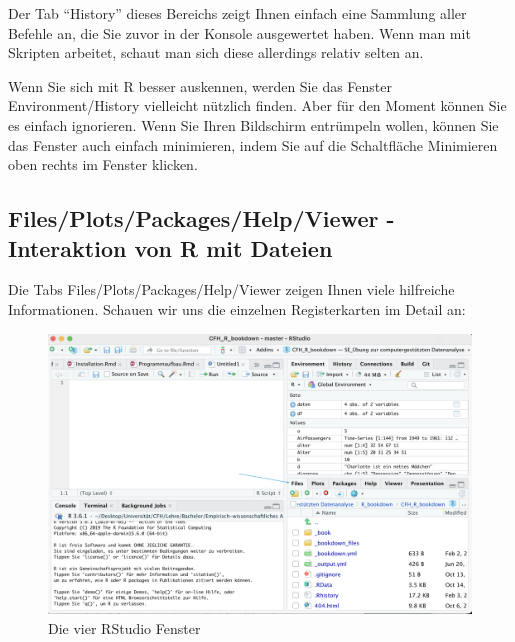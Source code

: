 \documentclass[
]{book}
\begin{document}
Der Tab ``History'' dieses Bereichs zeigt Ihnen einfach eine Sammlung aller Befehle an, die Sie zuvor in der Konsole ausgewertet haben. Wenn man mit Skripten arbeitet, schaut man sich diese allerdings relativ selten an.

Wenn Sie sich mit R besser auskennen, werden Sie das Fenster Environment/History vielleicht nützlich finden. Aber für den Moment können Sie es einfach ignorieren. Wenn Sie Ihren Bildschirm entrümpeln wollen, können Sie das Fenster auch einfach minimieren, indem Sie auf die Schaltfläche Minimieren oben rechts im Fenster klicken.

\hypertarget{filesplotspackageshelpviewer---interaktion-von-r-mit-dateien}{%
\subsection{Files/Plots/Packages/Help/Viewer - Interaktion von R mit Dateien}\label{filesplotspackageshelpviewer---interaktion-von-r-mit-dateien}}

Die Tabs Files/Plots/Packages/Help/Viewer zeigen Ihnen viele hilfreiche Informationen. Schauen wir uns die einzelnen Registerkarten im Detail an:

\begin{figure}
\includegraphics[width=28.08in]{images/windows_files} \caption{Die vier RStudio Fenster}\label{fig:unnamed-chunk-6}
\end{figure}
\end{document}
